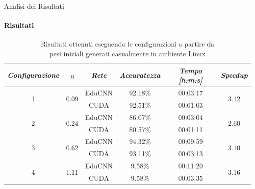 \documentclass[
 ]{beamer}
\begin{document}
\begin{frame}{Analisi dei Risultati}
    \framesubtitle{Risultati}

         \begin{table}
            \centering
            \renewcommand\arraystretch{1.3}
            \small
            \begin{tabular}{| c | c | c | c | c | c |}
                \hline
                \emph{Configurazione} & $\eta$ & \emph{Rete} & \emph{Accuratezza} & \emph{Tempo [h:m:s]} & \emph{Speedup} \\
                \hline
                \multirow{2}{*}{1} & \multirow{2}{*}{0.09} & EduCNN & 92.18\% & 00:03:17 & \multirow{2}{*}{3.12} \\ \cline{3-5} 
                                   &                       & CUDA   & 92.51\% & 00:01:03  & \\
                \hline
                \multirow{2}{*}{2} & \multirow{2}{*}{0.24} & EduCNN & 86.07\% & 00:03:04 & \multirow{2}{*}{2.60} \\ \cline{3-5} 
                                   &                       & CUDA   & 80.57\% & 00:01:11 & \\
                \hline
                \multirow{2}{*}{3} & \multirow{2}{*}{0.62} & EduCNN & 94.32\% & 00:09:59 & \multirow{2}{*}{3.10} \\ \cline{3-5} 
                                   &                       & CUDA   & 93.11\% & 00:03:13 & \\
                \hline
                \multirow{2}{*}{4} & \multirow{2}{*}{1.11} & EduCNN & 9.58\% & 00:11:20 & \multirow{2}{*}{3.16} \\ \cline{3-5} 
                                   &                       & CUDA   & 9.58\% & 00:03:35 & \\
                \hline
            \end{tabular}
            \caption                        
    {Risultati ottenuti eseguendo le configurazioni a partire da \\ pesi iniziali generati casualmente in ambiente Linux \endtabular}          
        \end{table}    
\end{frame}
\end{document}
